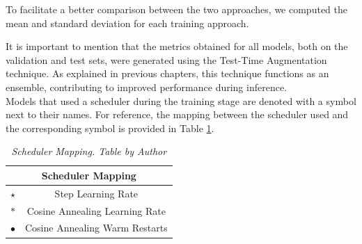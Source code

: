 To facilitate a better comparison between the two approaches, we computed the
mean and standard deviation for each training approach.

\newpage

It is important to mention that the metrics obtained for all models, both on
the validation and test sets, were generated using the Test-Time Augmentation
technique. As explained in previous chapters, this technique functions as an
ensemble, contributing to improved performance during inference. \\

Models that used a scheduler during the training stage are denoted with a
symbol next to their names. For reference, the mapping between the scheduler
used and the corresponding symbol is provided in Table
\ref{table:scheduler-mapping}.

\begin{table}[H]
  \centering
  \begin{tabular}{cc}
    \toprule
    \multicolumn{2}{c}{\textbf{Scheduler Mapping}} \\
    \midrule
    $\star$     & Step Learning Rate \\
    $\ast$      & Cosine Annealing Learning Rate \\
    $\bullet$   & Cosine Annealing Warm Restarts \\
    \bottomrule
  \end{tabular}
  \caption[Scheduler Mapping]
  {\textit{Scheduler Mapping.
  Table by Author}}
  \label{table:scheduler-mapping}
\end{table}

\newpage

